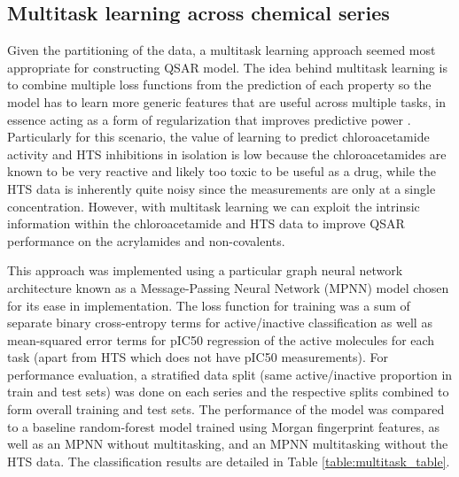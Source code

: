 \subsection{Multitask learning across chemical series}
Given the partitioning of the data, a multitask learning approach seemed most appropriate for constructing QSAR model. The idea behind multitask learning is to combine multiple loss functions from the prediction of each property so the model has to learn more generic features that are useful across multiple tasks, in essence acting as a form of regularization that improves predictive power \cite{zhang2017survey}. Particularly for this scenario, the value of learning to predict chloroacetamide activity and HTS inhibitions in isolation is low because the chloroacetamides are known to be very reactive and likely too toxic to be useful as a drug, while the HTS data is inherently quite noisy since the measurements are only at a single concentration. However, with multitask learning we can exploit the intrinsic information within the chloroacetamide and HTS data to improve QSAR performance on the acrylamides and non-covalents.

This approach was implemented using a particular graph neural network architecture known as a Message-Passing Neural Network (MPNN) model \cite{Gilmer17mpnn} chosen for its ease in implementation. The loss function for training was a sum of separate binary cross-entropy terms for active/inactive classification as well as mean-squared error terms for pIC50 regression of the active molecules for each task (apart from HTS which does not have pIC50 measurements). For performance evaluation, a stratified data split (same active/inactive proportion in train and test sets) was done on each series and the respective splits combined to form overall training and test sets. The performance of the model was compared to a baseline random-forest model trained using Morgan fingerprint features, as well as an MPNN without multitasking, and an MPNN multitasking without the HTS data. The classification results are detailed in Table \ref{table:multitask_table}.

